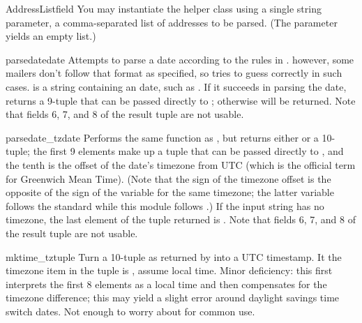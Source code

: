 \begin{classdesc}{AddressList}{field}
You may instantiate the  helper class using a single
string parameter, a comma-separated list of  addresses to be
parsed.  (The parameter  yields an empty list.)
\end{classdesc}

\begin{funcdesc}{parsedate}{date}
Attempts to parse a date according to the rules in .
however, some mailers don't follow that format as specified, so
 tries to guess correctly in such cases. 
 is a string containing an  date, such as 
.  If it succeeds in parsing
the date,  returns a 9-tuple that can be passed
directly to ; otherwise  will be
returned.  Note that fields 6, 7, and 8 of the result tuple are not
usable.
\end{funcdesc}

\begin{funcdesc}{parsedate_tz}{date}
Performs the same function as , but returns
either  or a 10-tuple; the first 9 elements make up a tuple
that can be passed directly to , and the tenth
is the offset of the date's timezone from UTC (which is the official
term for Greenwich Mean Time).  (Note that the sign of the timezone
offset is the opposite of the sign of the 
variable for the same timezone; the latter variable follows the
\POSIX{} standard while this module follows .)  If the input
string has no timezone, the last element of the tuple returned is
.  Note that fields 6, 7, and 8 of the result tuple are not
usable.
\end{funcdesc}

\begin{funcdesc}{mktime_tz}{tuple}
Turn a 10-tuple as returned by  into a UTC
timestamp.  It the timezone item in the tuple is , assume
local time.  Minor deficiency: this first interprets the first 8
elements as a local time and then compensates for the timezone
difference; this may yield a slight error around daylight savings time
switch dates.  Not enough to worry about for common use.
\end{funcdesc}


\begin{seealso}
\end{seealso}


